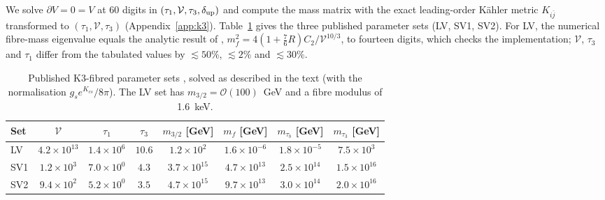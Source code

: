\documentclass[11pt]{article}
\begin{document}
We solve $\partial V=0=V$ at 60 digits in $(\tau_1,\mathcal V,\tau_3,\delta_{\rm up})$ and compute the mass matrix with the exact leading-order Kähler metric $K_{i\bar j}$ transformed to $(\tau_1,\mathcal V,\tau_3)$ (Appendix~\ref{app:k3}). Table~\ref{tab:k3sets} gives the three published parameter sets (LV, SV1, SV2). For LV, the numerical fibre-mass eigenvalue equals the analytic result of \cite{Cicoli:2008}, $m_f^2=4(1+\tfrac76R)C_2/\mathcal V^{10/3}$, to fourteen digits, which checks the implementation; $\mathcal V$, $\tau_3$ and $\tau_1$ differ from the tabulated values by $\lesssim50\%$, $\lesssim2\%$ and $\lesssim30\%$.
\begin{table}[t]
\centering\scriptsize
\begin{tabular}{l|ccccccc}
\toprule
Set & $\mathcal V$ & $\tau_1$ & $\tau_3$ & $m_{3/2}$ [GeV] & $m_f$ [GeV] & $m_{\tau_b}$ [GeV] & $m_{\tau_3}$ [GeV]\\
\midrule
LV & $4.2\times10^{13}$ & $1.4\times10^{6}$ & $10.6$ & $1.2\times10^{2}$ & $1.6\times10^{-6}$ & $1.8\times10^{-5}$ & $7.5\times10^{3}$ \\
SV1 & $1.2\times10^{3}$ & $7.0\times10^{0}$ & $4.3$ & $3.7\times10^{15}$ & $4.7\times10^{13}$ & $2.5\times10^{14}$ & $1.5\times10^{16}$ \\
SV2 & $9.4\times10^{2}$ & $5.2\times10^{0}$ & $3.5$ & $4.7\times10^{15}$ & $9.7\times10^{13}$ & $3.0\times10^{14}$ & $2.0\times10^{16}$ \\
\bottomrule
\end{tabular}
\caption{Published K3-fibred parameter sets \cite{Cicoli:2008}, solved as described in the text (with the normalisation $g_se^{K_{cs}}/8\pi$). The LV set has $m_{3/2}=\mathcal O(100)$~GeV and a fibre modulus of 1.6~keV.}\label{tab:k3sets}
\end{table}
\end{document}
